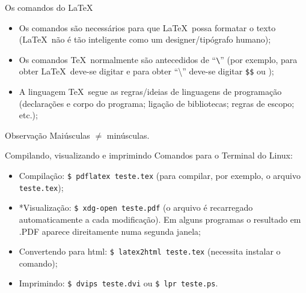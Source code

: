 

\begin{frame}{Os comandos do \LaTeX}
	\begin{itemize}
		\item Os comandos são necessários para que \LaTeX\ possa formatar o texto (\LaTeX\ não é tão inteligente como um designer/tipógrafo humano);
		\pause
		\item Os comandos \TeX\ normalmente são antecedidos de ``\texttt{\textbackslash}'' (por exemplo, para obter \LaTeX\ deve-se digitar  e para obter ``\textbackslash'' deve-se digitar \texttt{\$}\texttt{\$} ou );
		\pause
		\item A linguagem \TeX\ segue as regras/ideias de linguagens de programação (declarações e corpo do programa; ligação de bibliotecas; regras de escopo; etc.);
	\end{itemize}
	
    \begin{Observacao}{Observação}
	    Maiúsculas $\neq$ minúsculas.
    \end{Observacao}
\end{frame}

\begin{frame}[fragile=singleslide]{Compilando, visualizando e imprimindo}
	Comandos para o Terminal do Linux:
	\begin{itemize}
		\item Compilação: \verb'$ pdflatex teste.tex' (para compilar, por exemplo, o arquivo \verb'teste.tex');
		\pause
		\item *Visualização: \verb'$ xdg-open teste.pdf' (o arquivo é recarregado automaticamente a cada modificação). Em alguns programas o resultado em .PDF aparece direitamente numa segunda janela;
		\pause
		\item Convertendo para html: \verb'$ latex2html teste.tex' (necessita instalar o comando);
		\pause
		\item Imprimindo: \verb'$ dvips teste.dvi' ou \verb'$ lpr teste.ps'.
	\end{itemize}
\end{frame}

